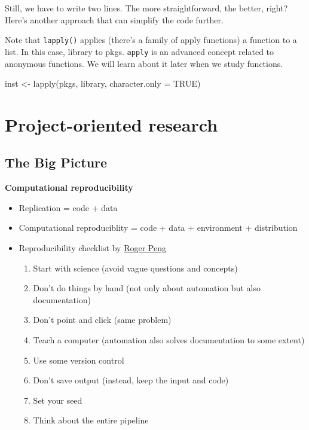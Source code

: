 \documentclass[
]{book}
\newenvironment{Shaded}{\begin{snugshade}}{\end{snugshade}}
\newcommand{\AttributeTok}[1]{\textcolor[rgb]{0.77,0.63,0.00}{#1}}
\newcommand{\ConstantTok}[1]{\textcolor[rgb]{0.00,0.00,0.00}{#1}}
\newcommand{\FunctionTok}[1]{\textcolor[rgb]{0.00,0.00,0.00}{#1}}
\newcommand{\NormalTok}[1]{#1}
\newcommand{\OtherTok}[1]{\textcolor[rgb]{0.56,0.35,0.01}{#1}}
\begin{document}
Still, we have to write two lines. The more straightforward, the better, right? Here's another approach that can simplify the code further.

Note that \texttt{lapply()} applies (there's a family of apply functions) a function to a list. In this case, library to pkgs. \texttt{apply} is an advanced concept related to anonymous functions. We will learn about it later when we study functions.

\begin{Shaded}
\begin{Highlighting}[]
\NormalTok{inst }\OtherTok{\textless{}{-}} \FunctionTok{lapply}\NormalTok{(pkgs, library, }
               \AttributeTok{character.only =} \ConstantTok{TRUE}\NormalTok{)}
\end{Highlighting}
\end{Shaded}

\hypertarget{project-oriented-research}{%
\section{Project-oriented research}\label{project-oriented-research}}

\hypertarget{the-big-picture-3}{%
\subsection{The Big Picture}\label{the-big-picture-3}}

\textbf{Computational reproducibility}

\begin{itemize}
\item
  Replication = code + data
\item
  Computational reproduciblity = code + data + environment + distribution
\item
  Reproducibility checklist by \href{http://www.biostat.jhsph.edu/~rpeng/}{Roger Peng}

  \begin{enumerate}
  \def\labelenumi{\arabic{enumi}.}
  \item
    Start with science (avoid vague questions and concepts)
  \item
    Don't do things by hand (not only about automation but also documentation)
  \item
    Don't point and click (same problem)
  \item
    Teach a computer (automation also solves documentation to some extent)
  \item
    Use some version control
  \item
    Don't save output (instead, keep the input and code)
  \item
    Set your seed
  \item
    Think about the entire pipeline
  \end{enumerate}
\end{itemize}
\end{document}
